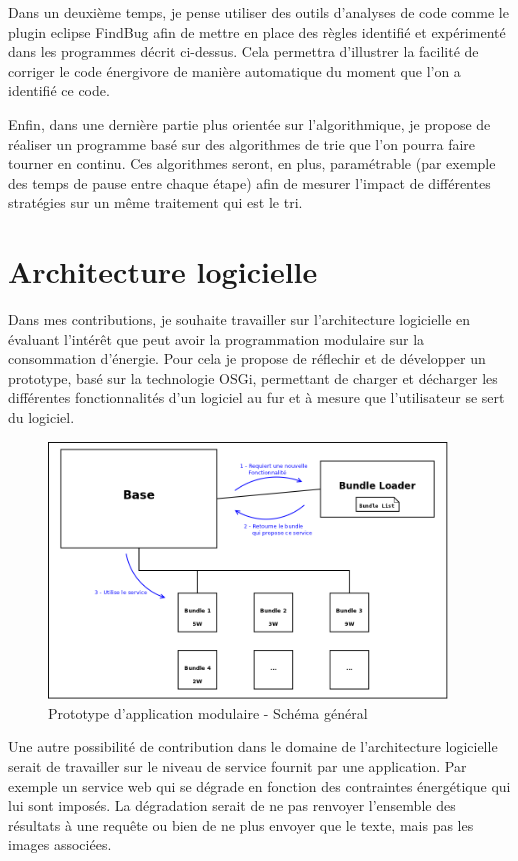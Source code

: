 \documentclass[a4paper, 11pt]{report}
\begin{document}
Dans un deuxième temps, je pense utiliser des outils d'analyses de code comme le plugin eclipse FindBug afin de mettre en place des règles identifié et expérimenté dans les programmes décrit ci-dessus. Cela permettra d'illustrer la facilité de corriger le code énergivore de manière automatique du moment que l'on a identifié ce code.

Enfin, dans une dernière partie plus orientée sur l'algorithmique, je propose de réaliser un programme basé sur des algorithmes de trie que l'on pourra faire tourner en continu. Ces algorithmes seront, en plus, paramétrable (par exemple des temps de pause entre chaque étape) afin de mesurer l'impact de différentes stratégies sur un même traitement qui est le tri.

\section{Architecture logicielle}
Dans mes contributions, je souhaite travailler sur l'architecture logicielle en évaluant l'intérêt que peut avoir la programmation modulaire sur la consommation d'énergie. Pour cela je propose de réflechir et de développer un prototype, basé sur la technologie OSGi, permettant de charger et décharger les différentes fonctionnalités d'un logiciel au fur et à mesure que l'utilisateur se sert du logiciel.

\begin{figure}
    \begin{center}
	\includegraphics[width=300pt]{../../Figures/OSGi/EcoPattern_General_Figure}
	\caption{Prototype d'application modulaire - Schéma général}
    \end{center}
\end{figure}

Une autre possibilité de contribution dans le domaine de l'architecture logicielle serait de travailler sur le niveau de service fournit par une application. Par exemple un service web qui se dégrade en fonction des contraintes énergétique qui lui sont imposés. La dégradation serait de ne pas renvoyer l'ensemble des résultats à une requête ou bien de ne plus envoyer que le texte, mais pas les images associées.
\end{document}
